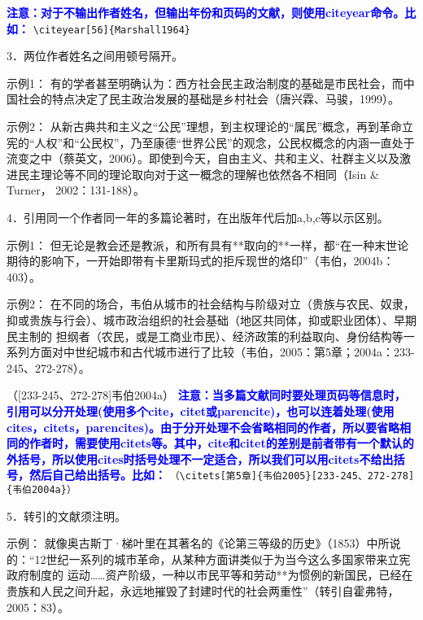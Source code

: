 \documentclass{article}
\newcommand{\qd}[1]{\textbf{\textcolor{blue}{#1}}}
\begin{document}
\citeyear[56]{Marshall1964}
\qd{注意：对于不输出作者姓名，但输出年份和页码的文献，则使用citeyear命令。比如：}
\verb|\citeyear[56]{Marshall1964}|

3．两位作者姓名之间用顿号隔开。

示例1：
有的学者甚至明确认为：西方社会民主政治制度的基础是市民社会，而中国社会的特点决定了民主政治发展的基础是乡村社会（唐兴霖、马骏，1999）。

\cite{唐兴霖1999}

示例2：
从新古典共和主义之“公民”理想，到主权理论的“属民”概念，再到革命立宪的“人权”和“公民权”，乃至康德“世界公民”的观念，公民权概念的内涵一直处于
流变之中（蔡英文，2006）。即使到今天，自由主义、共和主义、社群主义以及激进民主理论等不同的理论取向对于这一概念的理解也依然各不相同（Isin \& Turner，
2002：131-188）。

\cite{蔡英文2006}\cite[131-188]{Isin2002}


4．引用同一个作者同一年的多篇论著时，在出版年代后加a,b,c等以示区别。

示例1：
但无论是教会还是教派，和所有具有**取向的**一样，都“在一种末世论期待的影响下，一开始即带有卡里斯玛式的拒斥现世的烙印”（韦伯，2004b：403）。

\cite[403]{韦伯2004b}

示例2：
在不同的场合，韦伯从城市的社会结构与阶级对立（贵族与农民、奴隶，抑或贵族与行会）、城市政治组织的社会基础（地区共同体，抑或职业团体）、早期民主制的
担纲者（农民，或是工商业市民）、经济政策的利益取向、身份结构等一系列方面对中世纪城市和古代城市进行了比较（韦伯，2005：第5章；2004a：233-245、272-278）。

（[233-245、272-278]{韦伯2004a}）
\qd{注意：当多篇文献同时要处理页码等信息时，引用可以分开处理(使用多个cite，citet或parencite)，也可以连着处理(使用cites，citets，parencites)。由于分开处理不会省略相同的作者，所以要省略相同的作者时，需要使用citets等。其中，cite和citet的差别是前者带有一个默认的外括号，所以使用cites时括号处理不一定适合，所以我们可以用citets不给出括号，然后自己给出括号。比如：}
\verb|（\citets[第5章]{韦伯2005}[233-245、272-278]{韦伯2004a}）|

5．转引的文献须注明。

示例：
就像奥古斯丁·梯叶里在其著名的《论第三等级的历史》（1853）中所说的：“12世纪一系列的城市革命，从某种方面讲类似于为当今这么多国家带来立宪政府制度的
运动……资产阶级，一种以市民平等和劳动**为惯例的新国民，已经在贵族和人民之间升起，永远地摧毁了封建时代的社会两重性”（转引自霍弗特，2005：83）。
\end{document}
